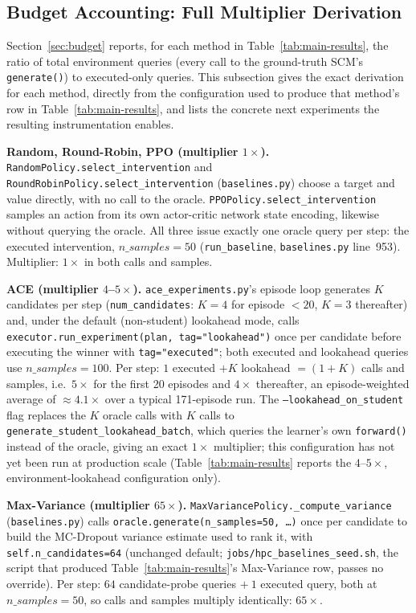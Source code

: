 \documentclass[twoside]{article}
\theoremstyle{plain}
\theoremstyle{definition}
\theoremstyle{remark}
\begin{document}
\subsection{Budget Accounting: Full Multiplier Derivation}
\label{app:budget-extended}

Section~\ref{sec:budget} reports, for each method in Table~\ref{tab:main-results}, the ratio of total environment queries (every call to the ground-truth SCM's \texttt{generate()}) to executed-only queries. This subsection gives the exact derivation for each method, directly from the configuration used to produce that method's row in Table~\ref{tab:main-results}, and lists the concrete next experiments the resulting instrumentation enables.

\textbf{Random, Round-Robin, PPO (multiplier $1\times$).} \texttt{RandomPolicy.select\_intervention} and \texttt{RoundRobinPolicy.select\_intervention} (\texttt{baselines.py}) choose a target and value directly, with no call to the oracle. \texttt{PPOPolicy.select\_intervention} samples an action from its own actor-critic network state encoding, likewise without querying the oracle. All three issue exactly one oracle query per step: the executed intervention, $n\_samples=50$ (\texttt{run\_baseline}, \texttt{baselines.py} line~953). Multiplier: $1\times$ in both calls and samples.

\textbf{ACE (multiplier $4$--$5\times$).} \texttt{ace\_experiments.py}'s episode loop generates $K$ candidates per step (\texttt{num\_candidates}: $K{=}4$ for episode $<20$, $K{=}3$ thereafter) and, under the default (non-student) lookahead mode, calls \texttt{executor.run\_experiment(plan, tag="lookahead")} once per candidate before executing the winner with \texttt{tag="executed"}; both executed and lookahead queries use $n\_samples=100$. Per step: $1$ executed $+ K$ lookahead $= (1+K)$ calls and samples, i.e.\ $5\times$ for the first 20 episodes and $4\times$ thereafter, an episode-weighted average of $\approx\!4.1\times$ over a typical 171-episode run. The \texttt{--lookahead\_on\_student} flag replaces the $K$ oracle calls with $K$ calls to \texttt{generate\_student\_lookahead\_batch}, which queries the learner's own \texttt{forward()} instead of the oracle, giving an exact $1\times$ multiplier; this configuration has not yet been run at production scale (Table~\ref{tab:main-results} reports the $4$--$5\times$, environment-lookahead configuration only).

\textbf{Max-Variance (multiplier $65\times$).} \texttt{MaxVariancePolicy.\_compute\_variance} (\texttt{baselines.py}) calls \texttt{oracle.generate(n\_samples=50, \ldots)} once per candidate to build the MC-Dropout variance estimate used to rank it, with \texttt{self.n\_candidates=64} (unchanged default; \texttt{jobs/hpc\_baselines\_seed.sh}, the script that produced Table~\ref{tab:main-results}'s Max-Variance row, passes no override). Per step: $64$ candidate-probe queries $+\ 1$ executed query, both at $n\_samples=50$, so calls and samples multiply identically: $65\times$.
\end{document}
